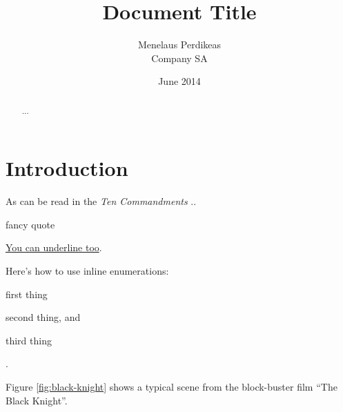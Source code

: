 \documentclass[11pt,twoside,a4paper,pagesize]{report}
\begin{document}
\title{\color{blue}Document Title}
\author{Menelaus Perdikeas\\ Company SA}
\date{June 2014}
\maketitle

\tableofcontents
\listoffigures
\lstlistoflistings

\renewcommand{\abstractname}{Executive Summary}
\begin{abstract}
...
\end{abstract}

\chapter{Introduction}
As can be read in the \textit{Ten Commandments} \cite{ref:ten-commandments} ..

\begin{quoting}
fancy quote
\end{quoting}

\uline{You can underline too}.

Here's how to use inline enumerations:
\begin{inparaenum}[i)]
\item first thing
\item second thing, and
\item third thing
\end{inparaenum}.

Figure \ref{fig:black-knight} shows a typical scene from the block-buster
film ``The Black Knight''.

\end{document}
